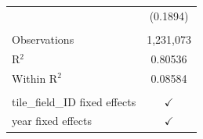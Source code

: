 \begin{table}[H]
\begin{tabular}{lc}
                                      & (0.1894)\\   
       \\
      Observations                    & 1,231,073\\  
      R$^2$                           & 0.80536\\  
      Within R$^2$                    & 0.08584\\  
       \\
      tile\_field\_ID fixed effects   & $\checkmark$\\   
      year fixed effects              & $\checkmark$\\   
      \bottomrule
   \end{tabular}
\end{table}


